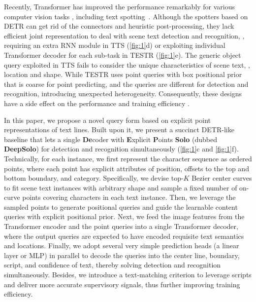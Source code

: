 \documentclass[10pt,twocolumn,letterpaper]{article}
\begin{document}
Recently, Transformer \cite{vaswani2017attention} has improved the performance remarkably for various computer vision tasks \cite{dosovitskiy2020image,liu2021swin,liu2022swin,wang2021pyramid,touvron2021training,xu2021vitae,zhang2022vitaev2,du2022i3cl,peng2021conformer,li2022panoptic}, including text spotting~\cite{huang2022swintextspotter,zhang2022text,peng2022spts,kittenplon2022towards}. Although the spotters \cite{zhang2022text,kittenplon2022towards} based on DETR \cite{carion2020end} can get rid of the connectors and heuristic post-processing, they lack efficient joint representation to deal with scene text detection and recognition, \eg, requiring an extra RNN module in TTS \cite{kittenplon2022towards} (\cref{fig:1}d) or exploiting individual Transformer decoder for each sub-task in TESTR \cite{zhang2022text} (\cref{fig:1}e). The generic object query exploited in TTS fails to consider the unique characteristics of scene text, \eg, location and shape. While TESTR uses point queries with box positional prior that is coarse for point predicting, and the queries are different for detection and recognition, introducing unexpected heterogeneity. Consequently, these designs have a side effect on the performance and training efficiency \cite{ye2022dptext}.

In this paper, we propose a novel query form based on explicit point representations of text lines. Built upon it, we present a succinct DETR-like baseline that lets a single \textbf{De}coder with \textbf{E}xplicit \textbf{P}oints \textbf{Solo} (dubbed \textbf{DeepSolo}) for detection and recognition simultaneously (\cref{fig:1}c and \cref{fig:1}f). Technically, for each instance, we first represent the character sequence as ordered points, where each point has explicit attributes of position, offsets to the top and bottom boundary, and category. Specifically, we devise top-$K$ Bezier center curves to fit scene text instances with arbitrary shape and sample a fixed number of on-curve points covering characters in each text instance. Then, we leverage the sampled points to generate positional queries and guide the learnable content queries with explicit positional prior. Next, we feed the image features from the Transformer encoder and the point queries into a single Transformer decoder, where the output queries are expected to have encoded requisite text semantics and locations. Finally, we adopt several very simple prediction heads (a linear layer or MLP) in parallel to decode the queries into the center line, boundary, script, and confidence of text, thereby solving detection and recognition simultaneously. Besides, we introduce a text-matching criterion to leverage scripts and deliver more accurate supervisory signals, thus further improving training efficiency.
\end{document}
